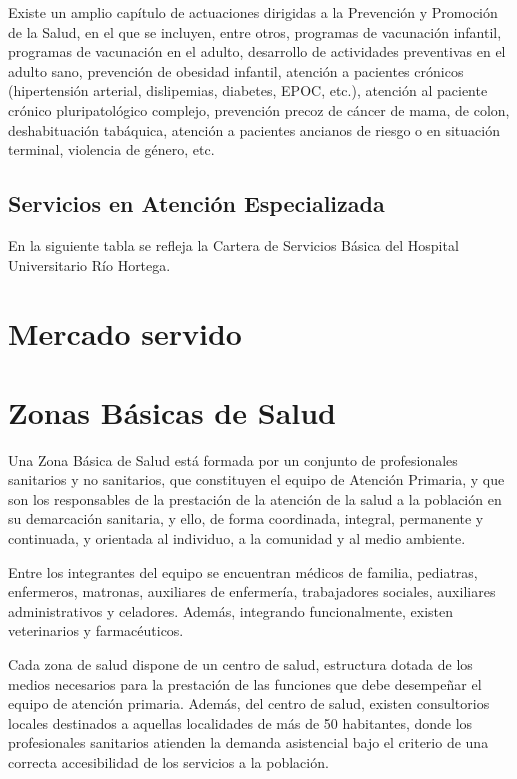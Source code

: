 Existe un amplio capítulo de actuaciones dirigidas a la Prevención y Promoción de la Salud, en el que se incluyen, entre otros, programas de vacunación infantil, programas de vacunación en el adulto, desarrollo de actividades preventivas en el adulto sano, prevención de obesidad infantil, atención a pacientes crónicos (hipertensión arterial, dislipemias, diabetes, EPOC, etc.), atención al paciente crónico pluripatológico complejo, prevención precoz de cáncer de mama, de colon, deshabituación tabáquica, atención a pacientes ancianos de riesgo o en situación terminal, violencia de género, etc.

\subsection{Servicios en Atención Especializada}

En la siguiente tabla se refleja la Cartera de Servicios Básica del Hospital Universitario Río Hortega.

\section{Mercado servido}


\section{Zonas Básicas de Salud}

Una Zona Básica de Salud está formada por un conjunto de profesionales sanitarios y no sanitarios, que constituyen el equipo de Atención Primaria, y que son los responsables de la prestación de la atención de la salud a la población en su demarcación sanitaria, y ello, de forma coordinada, integral, permanente y continuada, y orientada al individuo, a la comunidad y al medio ambiente.

Entre los integrantes del equipo se encuentran médicos de familia, pediatras, enfermeros, matronas, auxiliares de enfermería, trabajadores sociales, auxiliares administrativos y celadores. Además, integrando funcionalmente, existen veterinarios y farmacéuticos.

Cada zona de salud dispone de un centro de salud, estructura dotada de los medios necesarios para la prestación de las funciones que debe desempeñar el equipo de atención primaria. Además, del centro de salud, existen consultorios locales destinados a aquellas localidades de más de 50 habitantes, donde los profesionales sanitarios atienden la demanda asistencial bajo el criterio de una correcta accesibilidad de los servicios a la población.

